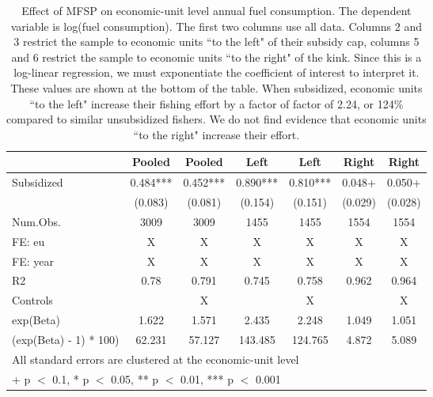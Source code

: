 \begin{table}

\caption{\label{tab:}Effect of MFSP on economic-unit level annual fuel consumption.
  The dependent variable is log(fuel consumption). The first two columns use all data.
  Columns 2 and 3 restrict the sample to economic units ``to the left" of their subsidy cap,
  columns 5 and 6 restrict the sample to economic units ``to the right" of the kink.
  Since this is a log-linear regression, we must exponentiate the coefficient of interest to interpret it.
  These values are shown at the bottom of the table. When subsidized, economic units
  ``to the left" increase their fishing effort by a factor of factor of 2.24, or 124\% compared to similar unsubsidized fishers.
  We do not find evidence that economic units ``to the right" increase their effort.}
\centering
\begin{tabular}[t]{lcccccc}
\toprule
  & Pooled & Pooled  & Left & Left  & Right & Right \\
\midrule
Subsidized & \num{0.484}*** & \num{0.452}*** & \num{0.890}*** & \num{0.810}*** & \num{0.048}+ & \num{0.050}+\\
 & (\num{0.083}) & (\num{0.081}) & (\num{0.154}) & (\num{0.151}) & (\num{0.029}) & (\num{0.028})\\
\midrule
Num.Obs. & \num{3009} & \num{3009} & \num{1455} & \num{1455} & \num{1554} & \num{1554}\\
FE: eu & X & X & X & X & X & X\\
FE: year & X & X & X & X & X & X\\
R2 & 0.78 & 0.791 & 0.745 & 0.758 & 0.962 & 0.964\\
Controls &  & X &  & X &  & X\\
exp(Beta) & 1.622 & 1.571 & 2.435 & 2.248 & 1.049 & 1.051\\
(exp(Beta) - 1) * 100) & 62.231 & 57.127 & 143.485 & 124.765 & 4.872 & 5.089\\
\bottomrule
\multicolumn{7}{l}{\rule{0pt}{1em}All standard errors are clustered at the economic-unit level}\\
\multicolumn{7}{l}{\rule{0pt}{1em}+ p $<$ 0.1, * p $<$ 0.05, ** p $<$ 0.01, *** p $<$ 0.001}\\
\end{tabular}
\end{table}
